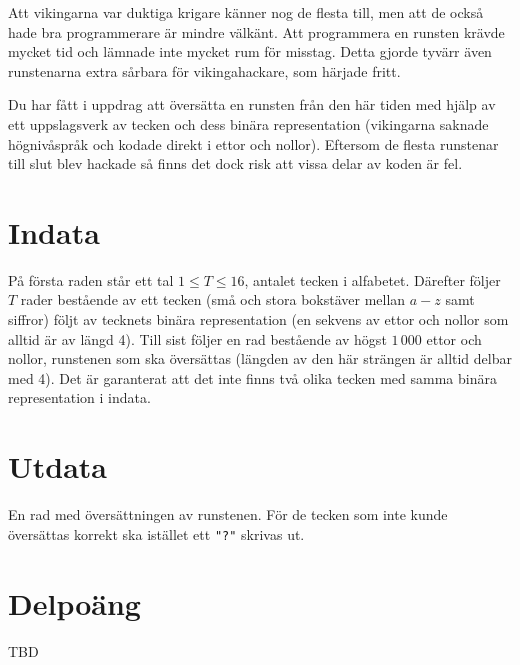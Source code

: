 Att vikingarna var duktiga krigare känner nog de flesta till, men att de också hade bra programmerare är mindre välkänt. Att programmera en runsten krävde mycket tid och lämnade inte mycket rum för misstag. Detta gjorde tyvärr även runstenarna extra sårbara för vikingahackare, som härjade fritt.

Du har fått i uppdrag att översätta en runsten från den här tiden med hjälp av ett uppslagsverk av tecken och dess binära representation (vikingarna saknade högnivåspråk och kodade direkt i ettor och nollor). Eftersom de flesta runstenar till slut blev hackade så finns det dock risk att vissa delar av koden är fel.

\section*{Indata}
På första raden står ett tal $1 \le T \le 16$, antalet tecken i alfabetet. Därefter följer $T$ rader bestående av ett tecken (små och stora bokstäver mellan $a-z$ samt siffror) följt av tecknets binära representation (en sekvens av ettor och nollor som alltid är av längd 4). Till sist följer en rad bestående av högst $1\,000$ ettor och nollor, runstenen som ska översättas (längden av den här strängen är alltid delbar med 4). Det är garanterat att det inte finns två olika tecken med samma binära representation i indata.

\section*{Utdata}
En rad med översättningen av runstenen. För de tecken som inte kunde översättas korrekt ska istället ett \texttt{"?"} skrivas ut.

\section*{Delpoäng}
TBD

